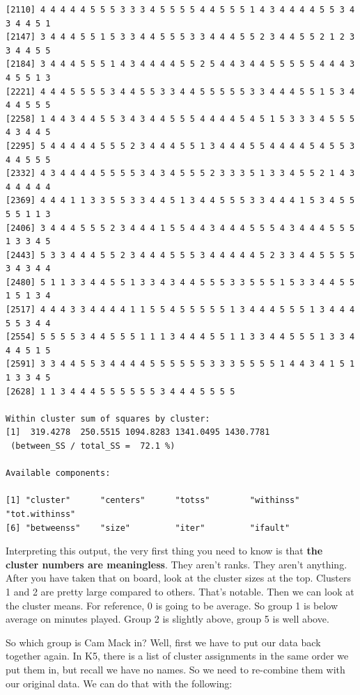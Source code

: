 \documentclass[
  letterpaper,
  DIV=11,
  numbers=noendperiod]{scrreprt}
\newenvironment{Shaded}{\begin{snugshade}}{\end{snugshade}}
\newcommand{\FunctionTok}[1]{\textcolor[rgb]{0.28,0.35,0.67}{#1}}
\newcommand{\NormalTok}[1]{\textcolor[rgb]{0.00,0.23,0.31}{#1}}
\newcommand{\OtherTok}[1]{\textcolor[rgb]{0.00,0.23,0.31}{#1}}
\newcommand{\SpecialCharTok}[1]{\textcolor[rgb]{0.37,0.37,0.37}{#1}}
\begin{document}
\begin{verbatim}
[2110] 4 4 4 4 4 5 5 5 3 3 3 4 5 5 5 5 4 4 5 5 5 1 4 3 4 4 4 4 5 5 3 4 3 4 4 5 1
[2147] 3 4 4 4 5 5 1 5 3 3 4 4 5 5 5 3 3 4 4 4 5 5 2 3 4 4 5 5 2 1 2 3 3 4 4 5 5
[2184] 3 4 4 4 5 5 5 1 4 3 4 4 4 4 5 5 2 5 4 4 3 4 4 5 5 5 5 5 4 4 4 3 4 5 5 1 3
[2221] 4 4 4 5 5 5 5 3 4 4 5 5 3 3 4 4 5 5 5 5 5 3 3 4 4 4 5 5 1 5 3 4 4 4 5 5 5
[2258] 1 4 4 3 4 4 5 5 3 4 3 4 4 5 5 5 4 4 4 4 5 4 5 1 5 3 3 3 4 5 5 5 4 3 4 4 5
[2295] 5 4 4 4 4 4 5 5 5 2 3 4 4 4 5 5 1 3 4 4 4 5 5 4 4 4 4 5 4 5 5 3 4 4 5 5 5
[2332] 4 3 4 4 4 4 5 5 5 5 3 4 3 4 5 5 5 2 3 3 3 5 1 3 3 4 5 5 2 1 4 3 4 4 4 4 4
[2369] 4 4 4 1 1 3 3 5 5 3 3 4 4 5 1 3 4 4 5 5 5 3 3 4 4 4 1 5 3 4 5 5 5 5 1 1 3
[2406] 3 4 4 4 5 5 5 2 3 4 4 4 1 5 5 4 4 3 4 4 4 5 5 5 4 3 4 4 4 5 5 5 1 3 3 4 5
[2443] 5 3 3 4 4 4 5 5 2 3 4 4 4 5 5 5 3 4 4 4 4 4 5 2 3 3 4 4 5 5 5 5 3 4 3 4 4
[2480] 5 1 1 3 3 4 4 5 5 1 3 3 4 3 4 4 5 5 5 3 3 5 5 5 1 5 3 3 4 4 5 5 1 5 1 3 4
[2517] 4 4 4 3 3 4 4 4 4 1 1 5 5 4 5 5 5 5 5 1 3 4 4 4 5 5 5 1 3 4 4 4 5 5 3 4 4
[2554] 5 5 5 5 3 4 4 5 5 5 1 1 1 3 4 4 4 5 5 1 1 3 3 4 4 5 5 5 1 3 3 4 4 4 5 1 5
[2591] 3 3 4 4 5 5 3 4 4 4 4 5 5 5 5 5 5 3 3 3 5 5 5 5 1 4 4 3 4 1 5 1 1 3 3 4 5
[2628] 1 1 3 4 4 4 5 5 5 5 5 5 3 4 4 4 5 5 5 5

Within cluster sum of squares by cluster:
[1]  319.4278  250.5515 1094.8283 1341.0495 1430.7781
 (between_SS / total_SS =  72.1 %)

Available components:

[1] "cluster"      "centers"      "totss"        "withinss"     "tot.withinss"
[6] "betweenss"    "size"         "iter"         "ifault"      
\end{verbatim}

Interpreting this output, the very first thing you need to know is that
\textbf{the cluster numbers are meaningless}. They aren't ranks. They
aren't anything. After you have taken that on board, look at the cluster
sizes at the top. Clusters 1 and 2 are pretty large compared to others.
That's notable. Then we can look at the cluster means. For reference, 0
is going to be average. So group 1 is below average on minutes played.
Group 2 is slightly above, group 5 is well above.

So which group is Cam Mack in? Well, first we have to put our data back
together again. In K5, there is a list of cluster assignments in the
same order we put them in, but recall we have no names. So we need to
re-combine them with our original data. We can do that with the
following:

\begin{Shaded}
\end{Shaded}
\end{document}
